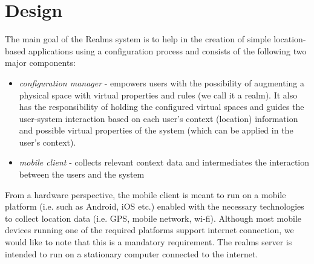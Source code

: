 \section{Design} %
\label{sec:design}
The main goal of the Realms system is to help in the creation of simple location-based applications using a configuration process and consists of the following two major components:
\begin{itemize}
	\item \emph{configuration manager} - empowers users with the possibility of augmenting a physical space with virtual properties and rules (we call it a realm). It also has the responsibility of holding the configured virtual spaces and guides the user-system interaction based on each user's context (location) information and possible virtual properties of the system (which can be applied in the user's context).
	\item \emph{mobile client} - collects relevant context data and intermediates the interaction between the users and the system
\end{itemize}

\noindent From a hardware perspective, the mobile client is meant to run on a mobile platform (i.e. such as Android, iOS etc.) enabled with the necessary technologies to collect location data (i.e. GPS, mobile network, wi-fi). Although most mobile devices running one of the required platforms support internet connection, we would like to note that this is a mandatory requirement. The realms server is intended to run on a stationary computer connected to the internet.
\\

